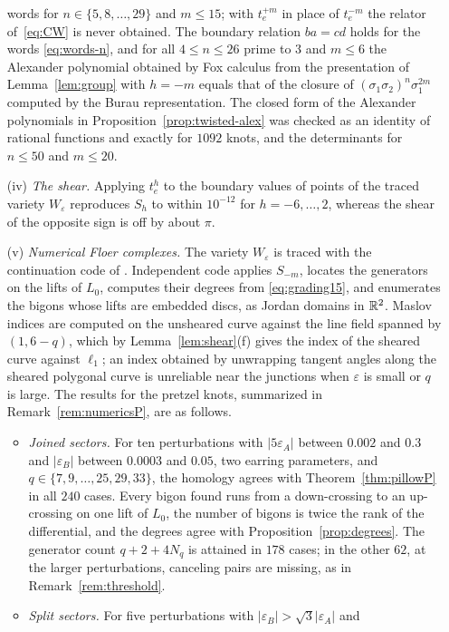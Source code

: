 \begin{enumerate}
 words for $n\in\{5,8,\dots,29\}$ and $m\le15$; with $t_e^{+m}$ in place of $t_e^{-m}$ the relator of~\eqref{eq:CW} is
 never obtained.  The boundary relation $ba=cd$ holds for the words \eqref{eq:words-n}, and for all $4\le n\le26$ prime
 to $3$ and $m\le6$ the Alexander polynomial obtained by Fox calculus from the presentation of
 Lemma~\ref{lem:group} with $h=-m$ equals that of the closure of $(\sigma_1\sigma_2)^n\sigma_1^{2m}$
 computed by the Burau representation.  The closed form of the Alexander polynomials in Proposition~\ref{prop:twisted-alex} was checked as an identity of rational functions and exactly for $1092$
 knots, and the determinants for $n\le50$ and $m\le20$.
\item[(iv)] \emph{The shear.}  Applying $t_e^h$ to the boundary values of points of the traced variety
 $W_\varepsilon$ reproduces $S_h$ to within $10^{-12}$ for $h=-6,\dots,2$, whereas the shear of the
 opposite sign is off by about $\pi$.
\item[(v)] \emph{Numerical Floer complexes.}  The variety $W_\varepsilon$ is traced with the continuation
 code of \cite{WuebbenV}.  Independent code applies $S_{-m}$, locates the generators on the lifts of
 $L_0$, computes their degrees from \eqref{eq:grading15}, and enumerates the bigons whose lifts are embedded
 discs, as Jordan domains in $\mathbb{R}^2$.  Maslov indices are computed on the unsheared curve against the line field spanned by
 $(1,6-q)$, which by Lemma~\ref{lem:shear}(f) gives the index of the sheared curve against $\ell_1$; an
 index obtained by unwrapping tangent angles along the sheared polygonal curve is unreliable near the
 junctions when $\varepsilon$ is small or $q$ is large.  The results for the pretzel knots, summarized in
 Remark~\ref{rem:numericsP}, are as follows.
 \begin{itemize}
 \item \emph{Joined sectors.} For ten perturbations with $|5\varepsilon_A|$ between $0.002$ and $0.3$ and
 $|\varepsilon_B|$ between $0.0003$ and $0.05$, two earring parameters, and $q\in\{7,9,\dots,25,29,33\}$, the
 homology agrees with Theorem~\ref{thm:pillowP} in all $240$ cases. Every bigon found runs from a down-crossing to
 an up-crossing on one lift of $L_0$, the number of bigons is twice the rank of the differential, and the degrees
 agree with Proposition~\ref{prop:degrees}. The generator count $q+2+4N_q$ is attained in $178$ cases; in the
 other $62$, at the larger perturbations, canceling pairs are missing, as in Remark~\ref{rem:threshold}.
 \item \emph{Split sectors.} For five perturbations with $|\varepsilon_B|>\sqrt3|\varepsilon_A|$ and

\end{itemize}
\end{enumerate}

